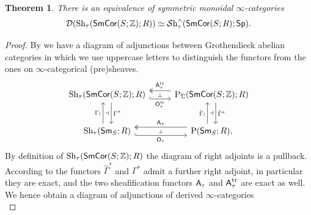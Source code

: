 \documentclass[reqno]{amsart}
\numberwithin{equation}{section}\theoremstyle{thms}
\newtheorem{thm}[equation]{Theorem}
\theoremstyle{defn}
\newcommand{\nP}{\tn{P}}
\newcommand{\bZ}{\mathbb{Z}}
\newcommand{\cD}{\mathcal{D}}
\newcommand{\tn}[1]{\textnormal{#1}}
\newcommand{\tsf}[1]{\textsf{\textup{#1}}}
\newcommand{\mcal}[1]{\mathcal{#1}}
\newcommand{\sheaves}{\mcal{S}\tn{h}}
\newcommand{\spec}{\tsf{Sp}}
\newcommand{\sms}{\tsf{Sm}_S}
\newcommand{\corsms}[1]{\tsf{SmCor}(S;#1)}
\begin{document}
\begin{thm}\label{thm:derivedsheaveswithtransfers}
There is an equivalence of symmetric monoidal $\infty$-categories
$$\cD(\tn{Sh}_{\tau}(\corsms{\bZ};R)) \simeq \sheaves_{\tau}^{\wedge}(\corsms{R};\spec).$$
\end{thm}
\begin{proof}
By \cite[§10]{cd19} we have a diagram of adjunctions between Grothendieck abelian categories in which we use uppercase letters to distinguish the functors from the ones on $\infty$-categorical (pre)sheaves.
\begin{equation}\label{diag:sheaveswithtransfers}
\begin{tikzcd}[column sep=0.9cm,row sep=0.9cm]
	{\tn{Sh}_{\tau}(\corsms{\bZ};R)} & {\nP_{\Sigma}(\corsms{\bZ};R)} \\
	{\tn{Sh}_{\tau}(\sms;R)} & {\nP(\sms;R),}
	\arrow[""{name=0, anchor=center, inner sep=0}, "{\tsf{O}_{\tau}^{\tn{tr}}}"', shift right=2, hook, from=1-1, to=1-2]
	\arrow[""{name=1, anchor=center, inner sep=0}, "{\Gamma^*}", shift left=2, from=1-1, to=2-1]
	\arrow[""{name=2, anchor=center, inner sep=0}, "{\tsf{A}_{\tau}^{\tn{tr}}}"', two heads, shift right=2, from=1-2, to=1-1]
	\arrow[""{name=3, anchor=center, inner sep=0}, "{\hat{\Gamma}^*}", shift left=2, from=1-2, to=2-2]
	\arrow[""{name=4, anchor=center, inner sep=0}, "{\Gamma_!}", shift left=2, from=2-1, to=1-1]
	\arrow[""{name=5, anchor=center, inner sep=0}, "{\tsf{O}_{\tau}}"', shift right=2, hook, from=2-1, to=2-2]
	\arrow[""{name=6, anchor=center, inner sep=0}, "{\hat{\Gamma}_!}", shift left=2, from=2-2, to=1-2]
	\arrow[""{name=7, anchor=center, inner sep=0}, "{\tsf{A}_{\tau}}"', two heads, shift right=2, from=2-2, to=2-1]
	\arrow["\dashv"{anchor=center, rotate=-90}, draw=none, from=2, to=0]
	\arrow["\dashv"{anchor=center}, draw=none, from=4, to=1]
	\arrow["\dashv"{anchor=center, rotate=-90}, draw=none, from=7, to=5]
	\arrow["\dashv"{anchor=center}, draw=none, from=6, to=3]
\end{tikzcd}
\end{equation}
By definition of $\tn{Sh}_{\tau}(\corsms{\bZ};R)$ the diagram of right adjoints is a pullback. According to \cite[Proposition 10.3.3, 10.3.9]{cd19} the functors $\hat{\Gamma}^*$ and $\Gamma^*$ admit a further right adjoint, in particular they are exact, and the two sheafification functors $\tsf{A}_{\tau}$ and $\tsf{A}^{\tn{tr}}_{\tau}$ are exact as well. We hence obtain a diagram of adjunctions of derived $\infty$-categories
\begin{equation}\label{diag:derivedsheaveswithtransfers}

\end{equation}
\end{proof}
\end{document}
